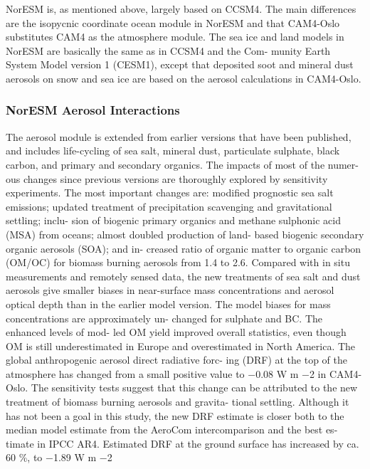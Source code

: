 \documentclass[
]{book}
\begin{document}
NorESM is, as mentioned above, largely based on CCSM4.
The main differences are the isopycnic coordinate ocean
module in NorESM and that CAM4-Oslo substitutes CAM4
as the atmosphere module. The sea ice and land models in
NorESM are basically the same as in CCSM4 and the Com-
munity Earth System Model version 1 (CESM1), except that
deposited soot and mineral dust aerosols on snow and sea ice
are based on the aerosol calculations in CAM4-Oslo.

\hypertarget{noresm-aerosol-interactions}{%
\subsubsection{NorESM Aerosol Interactions}\label{noresm-aerosol-interactions}}

The aerosol module is extended from earlier versions that
have been published, and includes life-cycling of sea salt,
mineral dust, particulate sulphate, black carbon, and primary
and secondary organics. The impacts of most of the numer-
ous changes since previous versions are thoroughly explored
by sensitivity experiments. The most important changes are:
modified prognostic sea salt emissions; updated treatment
of precipitation scavenging and gravitational settling; inclu-
sion of biogenic primary organics and methane sulphonic
acid (MSA) from oceans; almost doubled production of land-
based biogenic secondary organic aerosols (SOA); and in-
creased ratio of organic matter to organic carbon (OM/OC)
for biomass burning aerosols from 1.4 to 2.6.
Compared with in situ measurements and remotely sensed
data, the new treatments of sea salt and dust aerosols
give smaller biases in near-surface mass concentrations and
aerosol optical depth than in the earlier model version. The
model biases for mass concentrations are approximately un-
changed for sulphate and BC. The enhanced levels of mod-
led OM yield improved overall statistics, even though OM
is still underestimated in Europe and overestimated in North
America.
The global anthropogenic aerosol direct radiative forc-
ing (DRF) at the top of the atmosphere has changed from
a small positive value to −0.08 W m −2 in CAM4-Oslo. The
sensitivity tests suggest that this change can be attributed to
the new treatment of biomass burning aerosols and gravita-
tional settling. Although it has not been a goal in this study,
the new DRF estimate is closer both to the median model
estimate from the AeroCom intercomparison and the best es-
timate in IPCC AR4. Estimated DRF at the ground surface
has increased by ca. 60 \%, to −1.89 W m −2
\end{document}
